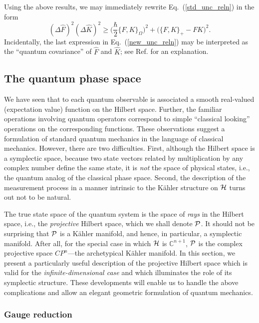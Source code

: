 \documentclass[12pt,aps,eqsecnum,tighten,nofootinbib]{revtex4-2}
\def\be{\begin{equation}}
\def\ee{\end{equation}}
\def\D{\Delta}
\def\C{{\mathbb C}}
\def\H{{\cal H}}
\def\P{{\cal P}}
\def\W{\Omega}
\newcommand{\eqn}[1]{Eq.~(\ref{#1})}
\def\Bbb{}
\def\C{\mathbb C}
\begin{document}
Using the above results, we may immediately rewrite \eqn{std_unc_reln}
in the form 
%
\be \label{new_unc_reln}
(\D \hat{F})^2 (\D \hat{K})^2 \ge
\bigg( \frac{\hbar}{2} \{ F, K \}_\W \bigg)^2
+ \big( \{ F, K \}_+ - FK \big)^2.
\ee
%
Incidentally, the last expression in \eqn{new_unc_reln} may be
interpreted as the ``quantum covariance'' of $\hat{F}$ and $\hat{K}$;
see Ref.  for an explanation.


\subsection{The quantum phase space} \label{sec2.B}

We have seen that to each quantum observable is associated a smooth
real-valued (expectation value) function on the Hilbert space.
Further, the familiar operations involving quantum operators
correspond to simple ``classical looking'' operations on the
corresponding functions.  These observations suggest a formulation of
standard quantum mechanics in the language of classical mechanics.
However, there are two difficulties.  First, although the Hilbert
space is a symplectic space, because two state vectors related by
multiplication by any complex number define the same state, it is {\it
not} the space of physical states, i.e., the quantum analog of the
classical phase space.  Second, the description of the measurement
process in a manner intrinsic to the K\"ahler structure on $\H$ turns
out not to be natural.

The true state space of the quantum system is the space of {\em rays}
in the Hilbert space, i.e., the {\em projective} Hilbert space, which
we shall denote $\P$.  It should not be surprising that $\P$ is a
K\"ahler manifold, and hence, in particular, a symplectic manifold.
After all, for the special case in which $\H$ is $\C^{n+1}$, $\P$ is
the complex projective space ${\Bbb CP}^n$---the archetypical K\"ahler
manifold.  In this section, we present a particularly useful
description of the projective Hilbert space which is valid for the
{\it infinite-dimensional case} and which illuminates the role of its
symplectic structure.  These developments will enable us to handle the
above complications and allow an elegant geometric formulation of
quantum mechanics.


\subsubsection{Gauge reduction}
\end{document}
